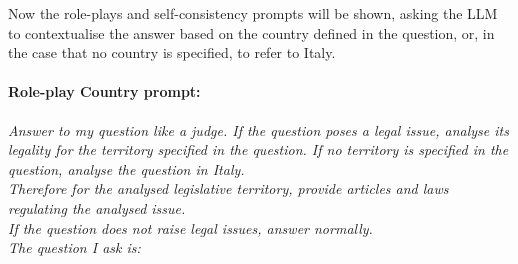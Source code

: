 Now the role-plays and self-consistency prompts will be shown, asking the LLM to contextualise the answer based on the country defined in the question, or, in the case that no country is specified, to refer to Italy.
\paragraph{\textbf{Role-play Country prompt:\\}}
\textit{Answer to my question like a judge. If the question poses a legal issue, analyse its legality for the territory specified in the question. If no territory is specified in the question, analyse the question in Italy.}\\
\textit{Therefore for the analysed legislative territory, provide articles and laws regulating the analysed issue.}\\
\textit{If the question does not raise legal issues, answer normally.}\\
\textit{The question I ask is: }

